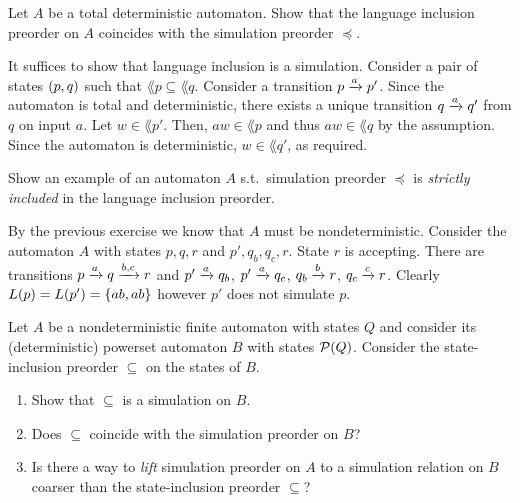\begin{exercise}
    Let $A$ be a total deterministic automaton.
    Show that the language inclusion preorder on $A$ coincides with the simulation preorder $\preceq$.
\end{exercise}
\begin{solution}
    It suffices to show that language inclusion is a simulation.
    Consider a pair of states $\left( p, q \right)$ such that $\lang p \subseteq \lang q$.
    Consider a transition $p \xrightarrow{a} p'$.
    Since the automaton is total and deterministic,
    there exists a unique transition $q \xrightarrow{a} q'$ from $q$ on input $a$.
    Let $w \in \lang {p'}$.
    Then, $aw \in \lang p$ and thus $aw \in \lang q$ by the assumption.
    Since the automaton is deterministic, $w \in \lang {q'}$, as required.
\end{solution}

\begin{exercise}
    Show an example of an automaton $A$ s.t.~simulation preorder $\preceq$
    is \emph{strictly included} in the language inclusion preorder.
\end{exercise}
\begin{solution}
    By the previous exercise we know that $A$ must be nondeterministic.
    Consider the automaton $A$ with states $p, q, r$ and $p', q_b, q_c, r$.
    State $r$ is accepting.
    There are transitions $p \xrightarrow{a} q \xrightarrow{b, c} r$
    and $p' \xrightarrow{a} q_b$, $p' \xrightarrow{a} q_c$, $q_b \xrightarrow{b} r$, $q_c \xrightarrow{c} r$.
    Clearly $L(p) = L(p') = \left\{ab, ab\right\}$
    however $p'$ does not simulate $p$.
\end{solution}

\begin{exercise}
    Let $A$ be a nondeterministic finite automaton with states $Q$
    and consider its (deterministic) powerset automaton $B$ with states $\mathcal P(Q)$.
    Consider the state-inclusion preorder $\subseteq$ on the states of $B$.
    \begin{enumerate}
        \item Show that $\subseteq$ is a simulation on $B$.
        \item Does $\subseteq$ coincide with the simulation preorder on $B$?
        \item Is there a way to \emph{lift} simulation preorder on $A$
        to a simulation relation on $B$ coarser than the state-inclusion preorder $\subseteq$?
    \end{enumerate}
\end{exercise}

